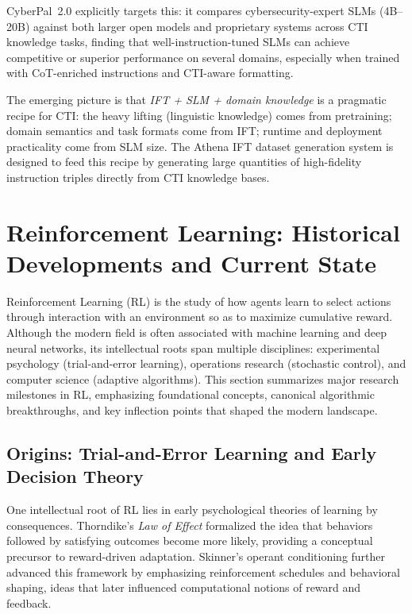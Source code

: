 \documentclass[10pt]{article}
\begin{document}
CyberPal~2.0 explicitly targets this: it compares cybersecurity-expert SLMs (4B--20B) against both larger open models and proprietary systems across CTI knowledge tasks, finding that well-instruction-tuned SLMs can achieve competitive or superior performance on several domains, especially when trained with CoT-enriched instructions and CTI-aware formatting.\cite{levi2025toward}

The emerging picture is that \emph{IFT + SLM + domain knowledge} is a pragmatic recipe for CTI: the heavy lifting (linguistic knowledge) comes from pretraining; domain semantics and task formats come from IFT; runtime and deployment practicality come from SLM size. The Athena IFT dataset generation system is designed to feed this recipe by generating large quantities of high-fidelity instruction triples directly from CTI knowledge bases.\cite{cardei2025ift}



\section{Reinforcement Learning: Historical Developments and Current State}
\label{sec:rl-history}

Reinforcement Learning (RL) is the study of how agents learn to select actions through interaction with an environment so as to maximize cumulative reward.
Although the modern field is often associated with machine learning and deep neural networks, its intellectual roots span multiple disciplines: experimental psychology (trial-and-error learning), operations research (stochastic control), and computer science (adaptive algorithms).
This section summarizes major research milestones in RL, emphasizing foundational concepts, canonical algorithmic breakthroughs, and key inflection points that shaped the modern landscape.

\subsection{Origins: Trial-and-Error Learning and Early Decision Theory}

One intellectual root of RL lies in early psychological theories of learning by consequences.
Thorndike’s \emph{Law of Effect} formalized the idea that behaviors followed by satisfying outcomes become more likely, providing a conceptual precursor to reward-driven adaptation.\cite{thorndike1898animal}
Skinner’s operant conditioning further advanced this framework by emphasizing reinforcement schedules and behavioral shaping, ideas that later influenced computational notions of reward and feedback.\cite{skinner1938behavior}
\end{document}
